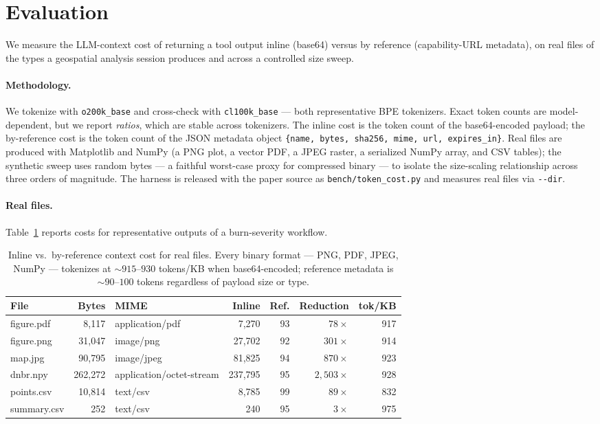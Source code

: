 \documentclass[11pt]{article}
\newcommand{\bref}{by reference}
\begin{document}
\section{Evaluation}\label{sec:eval}

We measure the LLM-context cost of returning a tool output inline (base64) versus \bref{} (capability-URL metadata), on real files of the types a geospatial analysis session produces and across a controlled size sweep.

\paragraph{Methodology.} We tokenize with \texttt{o200k\_base} and cross-check with \texttt{cl100k\_base} --- both representative BPE tokenizers. Exact token counts are model-dependent, but we report \emph{ratios}, which are stable across tokenizers. The inline cost is the token count of the base64-encoded payload; the by-reference cost is the token count of the JSON metadata object \texttt{\{name, bytes, sha256, mime, url, expires\_in\}}. Real files are produced with Matplotlib and NumPy (a PNG plot, a vector PDF, a JPEG raster, a serialized NumPy array, and CSV tables); the synthetic sweep uses random bytes --- a faithful worst-case proxy for compressed binary --- to isolate the size-scaling relationship across three orders of magnitude. The harness is released with the paper source as \texttt{bench/token\_cost.py} and measures real files via \texttt{-{}-dir}.

\paragraph{Real files.} Table~\ref{tab:realfiles} reports costs for representative outputs of a burn-severity workflow.

\begin{table}[htbp]\centering
\caption{Inline vs.\ by-reference context cost for real files. Every binary format --- PNG, PDF, JPEG, NumPy --- tokenizes at ${\sim}915$--$930$ tokens/KB when base64-encoded; reference metadata is ${\sim}90$--$100$ tokens regardless of payload size or type.}\label{tab:realfiles}
\begin{tabular}{lrlrrrr}
\toprule
File & Bytes & MIME & Inline & Ref. & Reduction & tok/KB \\
\midrule
figure.pdf   & 8{,}117   & application/pdf          & 7{,}270   & 93 & $78\times$    & 917 \\
figure.png   & 31{,}047  & image/png                & 27{,}702  & 92 & $301\times$   & 914 \\
map.jpg      & 90{,}795  & image/jpeg               & 81{,}825  & 94 & $870\times$   & 923 \\
dnbr.npy     & 262{,}272 & application/octet-stream & 237{,}795 & 95 & $2{,}503\times$ & 928 \\
points.csv   & 10{,}814  & text/csv                 & 8{,}785   & 99 & $89\times$    & 832 \\
summary.csv  & 252       & text/csv                 & 240       & 95 & $3\times$     & 975 \\
\bottomrule
\end{tabular}
\end{table}
\end{document}
